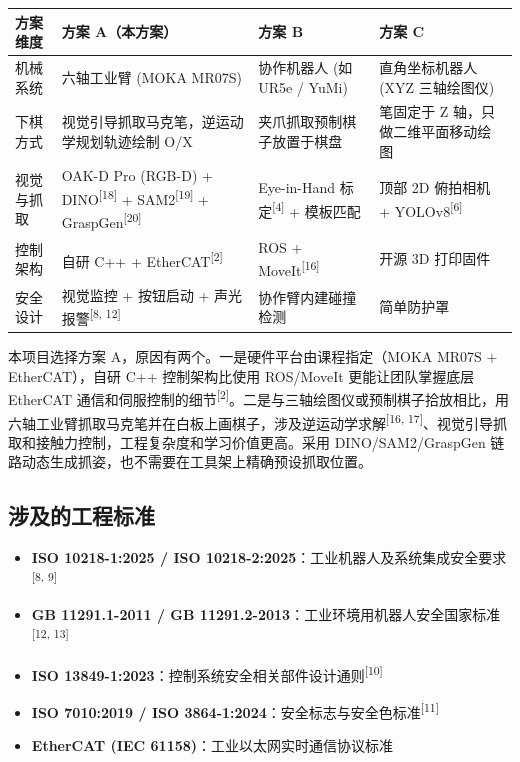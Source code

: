 \documentclass[a4paper, 12pt, oneside]{ctexart}
\newcommand{\supercite}[1]{\textsuperscript{[#1]}}
\begin{document}
\begin{center}
\renewcommand{\arraystretch}{1.3}
\begin{tabular}{|p{2.2cm}|p{4.0cm}|p{3.8cm}|p{3.8cm}|}
\hline
\textbf{方案维度} & \textbf{方案 A（本方案）} & \textbf{方案 B} & \textbf{方案 C} \\ \hline
机械系统 & 六轴工业臂 \newline (MOKA MR07S) & 协作机器人 \newline (如 UR5e / YuMi) & 直角坐标机器人 \newline (XYZ 三轴绘图仪) \\ \hline
下棋方式 & 视觉引导抓取马克笔，逆运动学规划轨迹绘制 O/X & 夹爪抓取预制棋子放置于棋盘 & 笔固定于 Z 轴，只做二维平面移动绘图 \\ \hline
视觉与抓取 & OAK-D Pro (RGB-D) + DINO\supercite{18} + SAM2\supercite{19} + GraspGen\supercite{20} & Eye-in-Hand 标定\supercite{4} + 模板匹配 & 顶部 2D 俯拍相机 + YOLOv8\supercite{6} \\ \hline
控制架构 & 自研 C++ + EtherCAT\supercite{2} & ROS + MoveIt\supercite{16} & 开源 3D 打印固件 \\ \hline
安全设计 & 视觉监控 + 按钮启动 + 声光报警\supercite{8, 12} & 协作臂内建碰撞检测 & 简单防护罩 \\ \hline
\end{tabular}
\end{center}

本项目选择方案 A，原因有两个。一是硬件平台由课程指定（MOKA MR07S + EtherCAT），自研 C++ 控制架构比使用 ROS/MoveIt 更能让团队掌握底层 EtherCAT 通信和伺服控制的细节\supercite{2}。二是与三轴绘图仪或预制棋子拾放相比，用六轴工业臂抓取马克笔并在白板上画棋子，涉及逆运动学求解\supercite{16, 17}、视觉引导抓取和接触力控制，工程复杂度和学习价值更高。采用 DINO/SAM2/GraspGen 链路动态生成抓姿，也不需要在工具架上精确预设抓取位置。

\subsection{涉及的工程标准}

\begin{itemize}
    \item \textbf{ISO 10218-1:2025 / ISO 10218-2:2025}：工业机器人及系统集成安全要求\supercite{8, 9}
    \item \textbf{GB 11291.1-2011 / GB 11291.2-2013}：工业环境用机器人安全国家标准\supercite{12, 13}
    \item \textbf{ISO 13849-1:2023}：控制系统安全相关部件设计通则\supercite{10}
    \item \textbf{ISO 7010:2019 / ISO 3864-1:2024}：安全标志与安全色标准\supercite{11}
    \item \textbf{EtherCAT (IEC 61158)}：工业以太网实时通信协议标准
\end{itemize}
\end{document}

